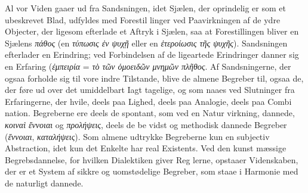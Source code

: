 \documentclass[12pt,a4paper]{book}
\newcommand{\gk}[1]{\textit{#1}}
\begin{document}
Al vor Viden gaaer ud fra Sandsningen, idet Sjælen, der
oprindelig er som et ubeskrevet Blad, udfyldes med Forestil\-%
linger ved Paavirkningen af de ydre Objecter, der ligesom
efterlade et Aftryk i Sjælen, saa at Forestillingen bliver en
Sjælens \gk{πάθος} (en \gk{τύπωσις ἐν ψυχῇ} eller en \gk{ἑτεροίωσις τῆς
ψυχῆς}). Sandsningen efterlader en Erindring; ved Forbindelsen
af de ligeartede Erindringer danner sig en Erfaring (\gk{ἐμπειρία}
= \gk{τὸ τῶν ὁμοειδῶν μνημῶν πλῆθος}. Af Sandsningerne,
der ogsaa forholde sig til vore indre Tilstande, blive de almene
Begreber til, ogsaa de, der føre ud over det umiddelbart Iagt\-%
tagelige, og som naaes ved Slutninger fra Erfaringerne, der
hvile, deels paa Lighed, deels paa Analogie, deels paa Combi\-%
nation. Begreberne ere deels de spontant, som ved en Natur\-%
virkning, dannede, \gk{κοιναὶ ἔννοιαι} og \gk{προλήψεις}, deels de be\-%
vidst og methodisk dannede Begreber (\gk{ἔννοιαι}, \gk{καταλήψεις}).
Som almene udtrykke Begreberne kun en subjectiv Abstraction,
idet kun det Enkelte har real Existents. Ved den kunst\-%
mæssige Begrebsdannelse, for hvilken Dialektiken giver Reg\-%
lerne, opstaaer Videnskaben, der er et System af sikkre og
uomstødelige Begreber, som staae i Harmonie med de naturligt
dannede.
\end{document}

